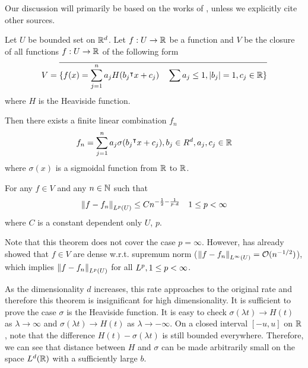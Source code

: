 Our discussion will primarily be based on the works of
\cite{maUniformApproximationRates2022, siegelSharpBoundsApproximation2022,
klusowskiApproximationCombinationsReLU2018a}, unless we explicitly cite other
sources.

\begin{theorem}
    \label{thm:improve_barron}
    Let $U$ be bounded set on $\mathbb{R}^d$. Let $f: U \to \mathbb{R}$ be a function and $V$ be
    the closure of all functions $f: U \to \mathbb{R}$ of the following form
    \begin{equation}
        V = \overline{
            \{f(x) = \sum_{j=1}^n a_j H(b_j{}^{\intercal} x + c_j) \quad 
            \sum a_j \leq 1, \left| b_j \right| = 1, c_j \in \mathbb{R} \}
            }
    \end{equation}
    where $H$ is the Heaviside function.

    Then there exists a finite linear combination $f_n$ 
    \begin{equation}
        f_n = \sum_{j=1}^n a_j \sigma(b_j{}^{\intercal} x + c_j), b_j \in R^d, a_j, c_j \in \mathbb{R}
    \end{equation}
    where $\sigma(x)$ is a sigmoidal function from $\mathbb{R}$ to $\mathbb{R}$.

    For any $f \in V$ and any $n \in \mathbb{N}$ such that 
    \begin{equation}
        \left\| f- f_n \right\|_{L^{p}(U)} \leq C n^{-\frac{1}{2} - \frac{1}{p \cdot d}}
        \quad 1 \leq p < \infty
    \end{equation}
    where $C$ is a constant dependent only $U$, $p$.
\end{theorem}


Note that this theorem does not cover the case $p = \infty$. However,
\cite{barronUniversalApproximationBounds1993} has already showed that $f\in V$
are dense w.r.t. supremum norm ($\left\| f - f_n \right\|_{L^{\infty}(U)} =
\mathcal{O}(n^{-1/2})$), which implies $\left\| f-f_n \right\|_{L^{p}(U)}$ for all $L^{p},
1 \leq p < \infty$.

As the dimensionality $d$ increases, this rate approaches to the original rate
and therefore this theorem is insignificant for high dimensionality. It is
sufficient to prove the case $\sigma$ is the Heaviside function. It is easy to
check $\sigma(\lambda t) \to H(t)$ as $\lambda \to \infty$ and $\sigma(\lambda
t) \to H(t)$ as $\lambda \to -\infty$. On a closed interval $[-u, u]$ on $\mathbb{R}$,
note that the difference $H(t) - \sigma(\lambda t)$ is still bounded everywhere.
Therefore, we can see that distance between $H$ and $\sigma$ can be made
arbitrarily small on the space $L^{d}(\mathbb{R})$ with a sufficiently large $b$.

